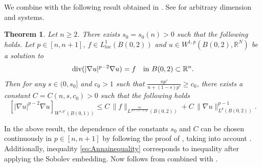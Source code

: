 \documentclass[12pt]{amsart}
\renewcommand{\div}{{\rm div}}
\newtheorem{theorem}{Theorem}
\newcommand{\R}{\mathbb{R}}
\numberwithin{theorem}{section} \numberwithin{equation}{section}
\begin{document}
We combine  with the following result obtained in \cite[Theorem 4.1]{BDW20}. See \cite[Remark 4.2]{BDW20} for arbitrary dimension and systems. 
\begin{theorem}\label{th:anna}
Let $n \geq 2$. There exists $s_0 = s_0(n)> 0$ such that the following holds. Let $p \in [n,n+1]$, $f \in L_{loc}^{1}(B(0,2))$ and $u \in W^{1,p}(B(0,2),\R^N)$ be a solution to 
\[
 \div(|\nabla u|^{p-2} \nabla u) = f \quad \text{in $B(0,2) \subset \R^n$}.
\]
Then for any $s \in (0,s_0]$ and $c_0>1$ such that $\frac{np'}{n+(1-s)p'} \geq c_0$, there exists a constant $C = C(n,s,c_0)>0$ such that the following holds
\begin{equation}\label{eq:Annainequality}
 \left[ |\nabla u|^{p-2} \nabla u \right]_{W^{s,p'}(B(0,1))} \leq C\,\|f\|_{L^{\frac{np'}{n+(1-s)p'}}(B(0,2))} + C\, \|\nabla u\|_{L^{p}(B(0,2))}^{p-1}.
\end{equation}
\end{theorem}
In the above result, the dependence of the constants $s_0$ and $C$ can be chosen continuously in $p\in [n,n+1]$ by following the proof of \cite[Theorem 4.1]{BDW20}, taking into account \cite[Remark 4.2]{BDW20}. Additionally, inequality \eqref{eq:Annainequality} corresponds to inequality \cite[(4.2)]{BDW20} after applying the Sobolev embedding. 
Now  follows from  
 combined with . 
\end{document}
